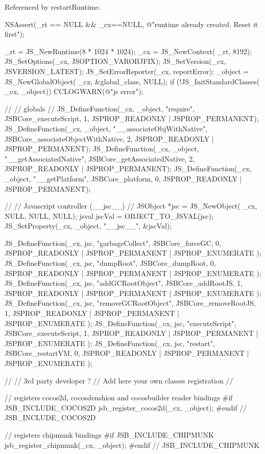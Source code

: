 Referenced by restart\-Runtime.


\begin{DoxyCode}
{
        NSAssert(_rt == NULL && _cx==NULL, @"runtime already created. Reset it
       first");

        _rt = JS_NewRuntime(8 * 1024 * 1024);
        _cx = JS_NewContext( _rt, 8192);
        JS_SetOptions(_cx, JSOPTION_VAROBJFIX);
        JS_SetVersion(_cx, JSVERSION_LATEST);
        JS_SetErrorReporter(_cx, reportError);
        _object = JS_NewGlobalObject( _cx, &global_class, NULL);
        if (!JS_InitStandardClasses( _cx, _object)) {
                CCLOGWARN(@"js error");
        }

        
        //
        // globals
        //
        JS_DefineFunction(_cx, _object, "require", JSBCore_executeScript, 1, 
      JSPROP_READONLY | JSPROP_PERMANENT);
        JS_DefineFunction(_cx, _object, "__associateObjWithNative", 
      JSBCore_associateObjectWithNative, 2, JSPROP_READONLY | JSPROP_PERMANENT);
        JS_DefineFunction(_cx, _object, "__getAssociatedNative", 
      JSBCore_getAssociatedNative, 2, JSPROP_READONLY | JSPROP_PERMANENT);
        JS_DefineFunction(_cx, _object, "__getPlatform", JSBCore_platform, 0, 
      JSPROP_READONLY | JSPROP_PERMANENT);

        // 
        // Javascript controller (__jsc__)
        //
        JSObject *jsc = JS_NewObject( _cx, NULL, NULL, NULL);
        jsval jscVal = OBJECT_TO_JSVAL(jsc);
        JS_SetProperty(_cx, _object, "__jsc__", &jscVal);

        JS_DefineFunction(_cx, jsc, "garbageCollect", JSBCore_forceGC, 0, 
      JSPROP_READONLY | JSPROP_PERMANENT | JSPROP_ENUMERATE );
        JS_DefineFunction(_cx, jsc, "dumpRoot", JSBCore_dumpRoot, 0, 
      JSPROP_READONLY | JSPROP_PERMANENT | JSPROP_ENUMERATE );
        JS_DefineFunction(_cx, jsc, "addGCRootObject", JSBCore_addRootJS, 1, 
      JSPROP_READONLY | JSPROP_PERMANENT | JSPROP_ENUMERATE );
        JS_DefineFunction(_cx, jsc, "removeGCRootObject", JSBCore_removeRootJS,
       1, JSPROP_READONLY | JSPROP_PERMANENT | JSPROP_ENUMERATE );
        JS_DefineFunction(_cx, jsc, "executeScript", JSBCore_executeScript, 1, 
      JSPROP_READONLY | JSPROP_PERMANENT | JSPROP_ENUMERATE );
        JS_DefineFunction(_cx, jsc, "restart", JSBCore_restartVM, 0, 
      JSPROP_READONLY | JSPROP_PERMANENT | JSPROP_ENUMERATE );

        //
        // 3rd party developer ?
        // Add here your own classes registration
        //
        
        // registers cocos2d, cocosdenshion and cocosbuilder reader bindings
#if JSB_INCLUDE_COCOS2D
        jsb_register_cocos2d(_cx, _object);
#endif // JSB_INCLUDE_COCOS2D
        
        // registers chipmunk bindings
#if JSB_INCLUDE_CHIPMUNK
        jsb_register_chipmunk(_cx, _object);
#endif // JSB_INCLUDE_CHIPMUNK
}
\end{DoxyCode}
